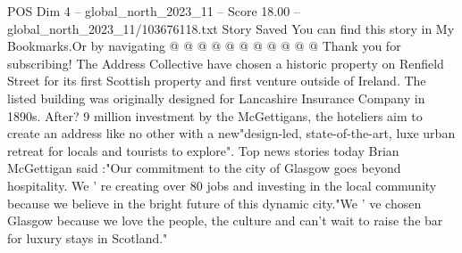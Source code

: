 \begin{textsample}{POS Dim 4 – global\_north\_2023\_11 – Score 18.00 – global\_north\_2023\_11/103676118.txt}
Story Saved You can find this story in My Bookmarks.Or by navigating @ @ @ @ @ @ @ @ @ @ @ Thank you for subscribing!
The Address Collective have chosen a historic property on Renfield Street for its first Scottish property and first venture outside of Ireland.
The listed building was originally designed for Lancashire Insurance Company in 1890s.
After? 9 million investment by the McGettigans, the hoteliers aim to create an address like no other with a new"design-led, state-of-the-art, luxe urban retreat for locals and tourists to explore".
Top news stories today Brian McGettigan said :"Our commitment to the city of Glasgow goes beyond hospitality.
We ' re creating over 80 jobs and investing in the local community because we believe in the bright future of this dynamic city."We ' ve chosen Glasgow because we love the people, the culture and can't wait to raise the bar for luxury stays in Scotland."

\end{textsample}
